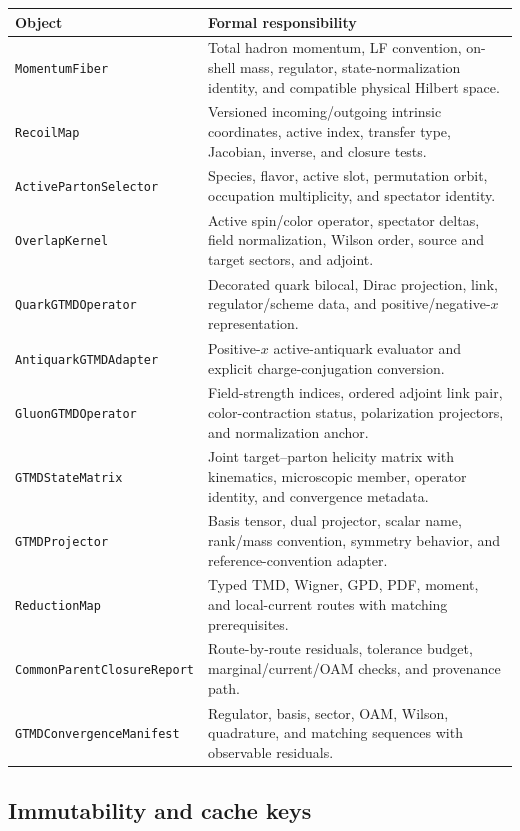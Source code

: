 \documentclass[11pt]{article}
\begin{document}
\begin{longtable}{L{0.25\textwidth}L{0.65\textwidth}}
\toprule
Object & Formal responsibility\\
\midrule
\endhead
\texttt{MomentumFiber} & Total hadron momentum, LF convention, on-shell mass, regulator, state-normalization identity, and compatible physical Hilbert space.\\
\texttt{RecoilMap} & Versioned incoming/outgoing intrinsic coordinates, active index, transfer type, Jacobian, inverse, and closure tests.\\
\texttt{ActivePartonSelector} & Species, flavor, active slot, permutation orbit, occupation multiplicity, and spectator identity.\\
\texttt{OverlapKernel} & Active spin/color operator, spectator deltas, field normalization, Wilson order, source and target sectors, and adjoint.\\
\texttt{QuarkGTMDOperator} & Decorated quark bilocal, Dirac projection, link, regulator/scheme data, and positive/negative-\(x\) representation.\\
\texttt{AntiquarkGTMDAdapter} & Positive-\(x\) active-antiquark evaluator and explicit charge-conjugation conversion.\\
\texttt{GluonGTMDOperator} & Field-strength indices, ordered adjoint link pair, color-contraction status, polarization projectors, and normalization anchor.\\
\texttt{GTMDStateMatrix} & Joint target--parton helicity matrix with kinematics, microscopic member, operator identity, and convergence metadata.\\
\texttt{GTMDProjector} & Basis tensor, dual projector, scalar name, rank/mass convention, symmetry behavior, and reference-convention adapter.\\
\texttt{ReductionMap} & Typed TMD, Wigner, GPD, PDF, moment, and local-current routes with matching prerequisites.\\
\texttt{CommonParent\allowbreak Closure\allowbreak Report} & Route-by-route residuals, tolerance budget, marginal/current/OAM checks, and provenance path.\\
\texttt{GTMD\allowbreak Convergence\allowbreak Manifest} & Regulator, basis, sector, OAM, Wilson, quadrature, and matching sequences with observable residuals.\\
\bottomrule
\end{longtable}

\subsection{Immutability and cache keys}
\end{document}
